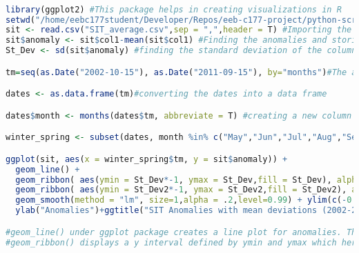 \documentclass{article} %
\begin{document}
\begin{lstlisting}[language=R, caption=Plotting variability in SIT]

library(ggplot2) #This package helps in creating visualizations in R
setwd("/home/eebc177student/Developer/Repos/eeb-c177-project/python-scripting") #setting the directory from where files would be read
sit <- read.csv("SIT_average.csv",sep = ",",header = T) #Importing the .csv file from the directory: those separated by commas
sit$anomaly <- sit$col1-mean(sit$col1) #Finding the anomalies and storing it in a new column within the dataset "sit"
St_Dev <- sd(sit$anomaly) #finding the standard deviation of the column anomaly St_Dev2 <- 2*sd(sit$anomaly)#Twice the deviation

tm=seq(as.Date("2002-10-15"), as.Date("2011-09-15"), by="months")#The as.date function creates the list of dates and spaces them according to defined 'by=' function which in this case is months. Hence, we get a list of monthly values. seq() function creates a continuous sequence of the dates defined. 

dates <- as.data.frame(tm)#converting the dates into a data frame

dates$month <- months(dates$tm, abbreviate = T) #creating a new column in the dataframe 'dates' called months which contain the "months" of the dates. month() helps in generating the months corresponding to the dates. 

winter_spring <- subset(dates, month %in% c("May","Jun","Jul","Aug","Sep","Oct")) #subset() is used for filtering the required values from a given dataframe. Here, it is the months from May to Oct. 

ggplot(sit, aes(x = winter_spring$tm, y = sit$anomaly)) +
  geom_line() +
  geom_ribbon( aes(ymin = St_Dev*-1, ymax = St_Dev,fill = St_Dev), alpha = .15) +
  geom_ribbon( aes(ymin = St_Dev2*-1, ymax = St_Dev2,fill = St_Dev2), alpha = .15)+
  geom_smooth(method = "lm", size=1,alpha = .2,level=0.99) + ylim(c(-0.5,0.5)) +xlab("Years")+
  ylab("Anomalies")+ggtitle("SIT Anomalies with mean deviations (2002-2011)")+labs(colur="Standard Deviation")

#geom_line() under ggplot package creates a line plot for anomalies. The line plot is overlaid by smoothed trend line using a method ="lm" which means linear model. 
#geom_ribbon() displays a y interval defined by ymin and ymax which here are defined by the positive and negative values of Standard deviation(SD) and 2*SD.    

\end{lstlisting}
\end{document}
